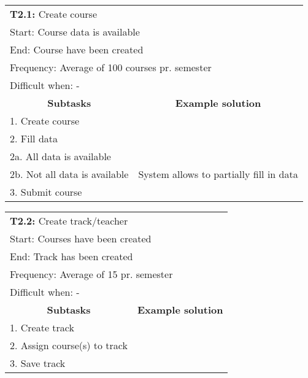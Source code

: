 \begin{tabular}{|p{6cm}|p{6cm}|}
\hline 
	\multicolumn{2}{|l|}{\textbf{T2.1:} \hspace{26mm}Create course} \\
	\multicolumn{2}{|l|}{Start: \hspace{26mm}Course data is available} \\
	\multicolumn{2}{|l|}{End: \hspace{28mm}Course have been created} \\
	\multicolumn{2}{|l|}{Frequency: \hspace{17mm}Average of 100 courses pr. semester} \\
	\multicolumn{2}{|l|}{Difficult when: \hspace{10mm} - } \\ \hline
	\multicolumn{1}{|c|}{\textbf{Subtasks}} & \multicolumn{1}{c|}{\textbf{Example solution}} \\ \hline
	1.  Create course & \\ \hline
	2.  Fill data & \\
	2a. All data is available & \\
	2b. Not all data is available & System allows to partially fill in data \\ \hline
	3.  Submit course & \\ \hline
\end{tabular}
\newline
\vspace{1cm}
\newline
\begin{tabular}{|p{6cm}|p{6cm}|}
\hline 
	\multicolumn{2}{|l|}{\textbf{T2.2:} \hspace{26mm}Create track/teacher} \\
	\multicolumn{2}{|l|}{Start: \hspace{26mm}Courses have been created} \\
	\multicolumn{2}{|l|}{End: \hspace{28mm}Track has been created} \\
	\multicolumn{2}{|l|}{Frequency: \hspace{17mm}Average of 15 pr. semester} \\
	\multicolumn{2}{|l|}{Difficult when: \hspace{10mm} - } \\ \hline
	\multicolumn{1}{|c|}{\textbf{Subtasks}} & \multicolumn{1}{c|}{\textbf{Example solution}} \\ \hline
	1.  Create track & \\ \hline
	2.  Assign course(s) to track & \\ \hline
	3.  Save track & \\ \hline
\end{tabular}
